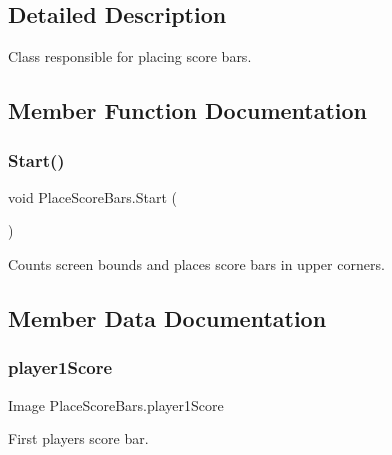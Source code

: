 \subsection{Detailed Description}
Class responsible for placing score bars. 



\subsection{Member Function Documentation}
\mbox{\label{class_place_score_bars_adf99a036ca929e8b17236267e9dc3737}} 
\subsubsection{\texorpdfstring{Start()}{Start()}}
{\footnotesize\ttfamily void Place\+Score\+Bars.\+Start (\begin{DoxyParamCaption}{ }\end{DoxyParamCaption})\hspace{0.3cm}{\ttfamily [private]}}



Counts screen bounds and places score bars in upper corners. 



\subsection{Member Data Documentation}
\mbox{\label{class_place_score_bars_acbdc64a22696d614a80fb2290e2e7be7}} 
\subsubsection{\texorpdfstring{player1\+Score}{player1Score}}
{\footnotesize\ttfamily Image Place\+Score\+Bars.\+player1\+Score}



First player\textquotesingle{}s score bar. 

\mbox{\label{class_place_score_bars_a53a2fc54c5de9160788eac17a2ff9e90}} 
